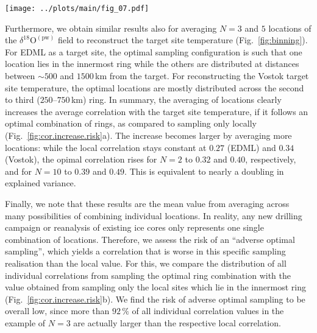 \documentclass[cp, manuscript]{copernicus}
\begin{document}
\begin{figure*}[t]%
\centering
\texttt{[image: ../plots/main/fig\_07.pdf]}
\caption{%
  The optimal arrangement for averaging three or five
  $\delta^{18}\mathrm{O}^{\mathrm{(pw)}}$ ice cores to reconstruct the target
  site temperature at the EDML (\textbf{a}, \textbf{c}) and Vostok (\textbf{b},
  \textbf{d}) drilling sites. Displayed are subsets of the sampling correlation
  structures for $N=3$ and $5$, showing the optimal five of all possible
  combinations of rings, i.e. those which exhibit the highest mean correlation
  across $10^5$ random trials of averaging $N=3$ (\textbf{a}, \textbf{b}) or
  $N=5$ (\textbf{c}, \textbf{d}) grid cells from these rings.}
\label{fig:binning}%
\end{figure*}%

Furthermore, we obtain similar results also for averaging $N=3$ and $5$
locations of the $\delta^{18}\mathrm{O}^{\mathrm{(pw)}}$ field to reconstruct
the target site temperature (Fig.~\ref{fig:binning}). For EDML as a target site,
the optimal sampling configuration is such that one location lies in the
innermost ring while the others are distributed at distances between $\sim500$
and $1500$\,km from the target. For reconstructing the Vostok target site
temperature, the optimal locations are mostly distributed across the second to
third ($250$--$750$\,km) ring. In summary, the averaging of locations clearly
increases the average correlation with the target site temperature, if it
follows an optimal combination of rings, as compared to sampling only locally
(Fig.~\ref{fig:cor.increase.risk}a). The increase becomes larger by averaging
more locations: while the local correlation stays constant at $0.27$ (EDML) and
$0.34$ (Vostok), the opimal correlation rises for $N=2$ to $0.32$ and $0.40$,
respectively, and for $N=10$ to $0.39$ and $0.49$. This is equivalent to nearly
a doubling in explained variance.

Finally, we note that these results are the mean value from averaging across
many possibilities of combining individual locations. In reality, any new
drilling campaign or reanalysis of existing ice cores only represents one single
combination of locations. Therefore, we assess the risk of an ``adverse optimal
sampling'', which yields a correlation that is worse in this specific sampling
realisation than the local value. For this, we compare the distribution of all
individual correlations from sampling the optimal ring combination with the
value obtained from sampling only the local sites which lie in the innermost
ring (Fig.~\ref{fig:cor.increase.risk}b). We find the risk of adverse optimal
sampling to be overall low, since more than $92\,\%$ of all individual
correlation values in the example of $N=3$ are actually larger than the
respective local correlation.
\end{document}

